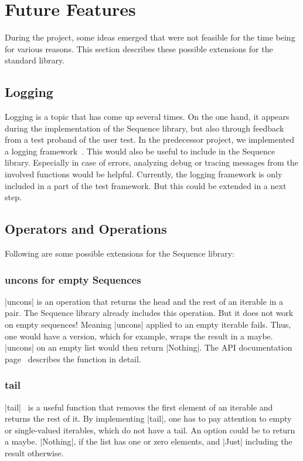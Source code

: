 \section{Future Features}
\label{sec:Future Features}
During the project, some ideas emerged that were not feasible for the time
being for various reasons. This section describes these possible extensions for
the standard library.

\subsection{Logging}
\label{sub:Logging}
Logging is a topic that has come up several times. On the one hand, it appears
during the implementation of the Sequence library, but also through feedback
from a test proband of the user test. In the predecessor project, we implemented
a logging framework~\cite{wild_ip5_2023}. This would also be useful to include
in the Sequence library. Especially in case of errors, analyzing debug or
tracing messages from the involved functions would be helpful. Currently, the
logging framework is only included in a part of the test framework. But this
could be extended in a next step.

\subsection{Operators and Operations}
\label{sub:Operators and Operations}
Following are some possible extensions for the Sequence library:

\subsubsection{uncons for empty Sequences}
\label{subsub:uncons}
|uncons| is an operation that returns the head and the rest of an iterable in a
pair. The Sequence library already includes this operation.
But it does not work on empty sequences! Meaning |uncons| applied to an
empty iterable fails. Thus, one would have a version, which for example, wraps the
result in a maybe. |uncons| on an empty list would then return |Nothing|.
The API documentation page~\cite{hoogle_uncons} describes the function in
detail.

\subsubsection{tail}
\label{subsub:tail}
|tail|~\cite{hoogle_tail} is a useful function that removes the first element
of an iterable and returns the rest of it. By implementing |tail|, one has to
pay attention to empty or single-valued iterables, which do not have a tail. An
option could be to return a maybe. |Nothing|, if the list has one or zero
elements, and |Just| including the result otherwise.

